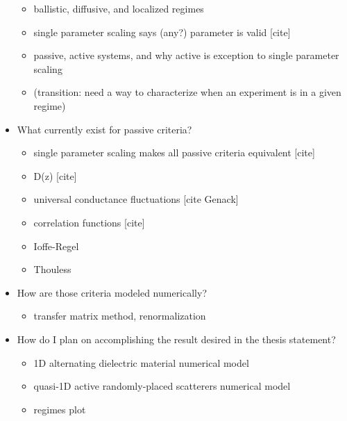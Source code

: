 \documentclass[pdftex]{article}
\begin{document}
\begin{itemize}
 \begin{itemize}
  \item ballistic, diffusive, and localized regimes 
  \item single parameter scaling says (any?) parameter is valid [cite]
  \item passive, active systems, and why active is exception to single parameter scaling
  \item (transition: need a way to characterize when an experiment is in a given regime)
 \end{itemize}
 \item What currently exist for passive criteria?
 \begin{itemize}
  \item single parameter scaling makes all passive criteria equivalent [cite]
  \item D(z) [cite]
  \item universal conductance fluctuations  [cite Genack]
  \item correlation functions [cite]
  \item Ioffe-Regel
  \item Thouless
 \end{itemize}
 \item How are those criteria modeled numerically?
 \begin{itemize}
  \item transfer matrix method, renormalization
 \end{itemize}
 \item How do I plan on accomplishing the result desired in the thesis statement?
 \begin{itemize}
  \item 1D alternating dielectric material numerical model
  \item quasi-1D active randomly-placed scatterers numerical model
  \item regimes plot
 \end{itemize}
\end{itemize}
\end{document}
